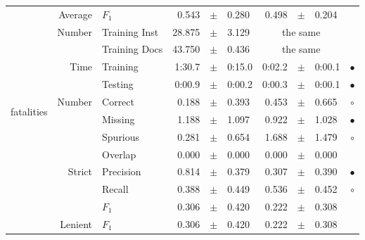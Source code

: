 \begin{longtable}{|r|r|l||rcl|rcl|c|}
\cline{2-10} &                     Average &           $F_1$ &       0.543 &  $\pm$  &       0.280 &       0.498 &  $\pm$  &       0.204 &  \\
\cline{2-10} & \multirow{2}{*}{    Number} &   Training Inst &      28.875 &  $\pm$  &       3.129 &    \multicolumn{3}{c|}{the same}         &  \\
\cline{3-10} &                             &   Training Docs &      43.750 &  $\pm$  &       0.436 &    \multicolumn{3}{c|}{the same}         &  \\
\cline{2-10} & \multirow{2}{*}{      Time} &        Training &      1:30.7 &  $\pm$  &      0:15.0 &      0:02.2 &  $\pm$  &      0:00.1 & $\bullet$ \\
\cline{3-10} &                             &         Testing &      0:00.9 &  $\pm$  &      0:00.2 &      0:00.3 &  $\pm$  &      0:00.1 & $\bullet$ \\
\hline
\hline
\multirow{11}{*}{\begin{sideways}fatalities\end{sideways} }
             & \multirow{4}{*}{    Number} &         Correct &       0.188 &  $\pm$  &       0.393 &       0.453 &  $\pm$  &       0.665 & $\circ$ \\
\cline{3-10} &                             &         Missing &       1.188 &  $\pm$  &       1.097 &       0.922 &  $\pm$  &       1.028 & $\bullet$ \\
\cline{3-10} &                             &        Spurious &       0.281 &  $\pm$  &       0.654 &       1.688 &  $\pm$  &       1.479 & $\circ$ \\
\cline{3-10} &                             &         Overlap &       0.000 &  $\pm$  &       0.000 &       0.000 &  $\pm$  &       0.000 &  \\
\cline{2-10} & \multirow{3}{*}{    Strict} &       Precision &       0.814 &  $\pm$  &       0.379 &       0.307 &  $\pm$  &       0.390 & $\bullet$ \\
\cline{3-10} &                             &          Recall &       0.388 &  $\pm$  &       0.449 &       0.536 &  $\pm$  &       0.452 & $\circ$ \\
\cline{3-10} &                             &           $F_1$ &       0.306 &  $\pm$  &       0.420 &       0.222 &  $\pm$  &       0.308 &  \\
\cline{2-10} &                     Lenient &           $F_1$ &       0.306 &  $\pm$  &       0.420 &       0.222 &  $\pm$  &       0.308 &  \\

\end{longtable}
